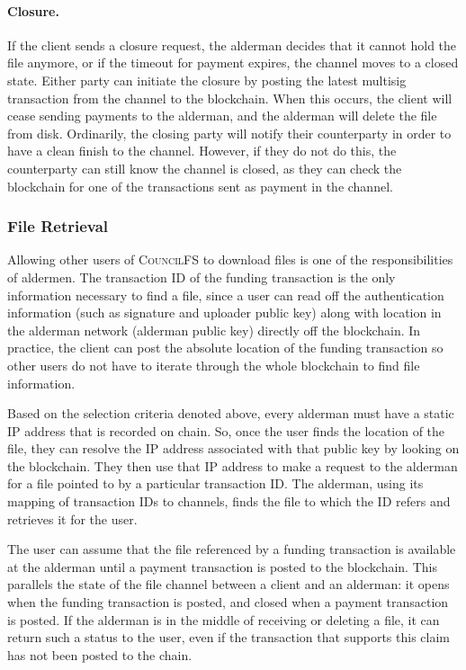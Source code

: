 \documentclass{article}
\begin{document}
\paragraph{Closure.} If the client sends a closure request, the alderman decides
that it cannot hold the file anymore, or if the timeout for payment expires, the
channel moves to a closed state. Either party can initiate the closure by
posting the latest multisig transaction from the channel to the blockchain. When
this occurs, the client will cease sending payments to the alderman, and the
alderman will delete the file from disk. Ordinarily, the closing party will
notify their counterparty in order to have a clean finish to the channel.
However, if they do not do this, the counterparty can still know the channel is
closed, as they can check the blockchain for one of the transactions sent as
payment in the channel.

\subsubsection{File Retrieval}

Allowing other users of \textsc{CouncilFS} to download files is one of the
responsibilities of aldermen. The transaction ID of the funding transaction is
the only information necessary to find a file, since a user can read off the
authentication information (such as signature and uploader public key) along
with location in the alderman network (alderman public key) directly off the
blockchain. In practice, the client can post the absolute location of the
funding transaction so other users do not have to iterate through the whole
blockchain to find file information.

Based on the selection criteria denoted above, every alderman must have a static
IP address that is recorded on chain. So, once the user finds the location of
the file, they can resolve the IP address associated with that public key by
looking on the blockchain. They then use that IP address to make a request to
the alderman for a file pointed to by a particular transaction ID. The alderman,
using its mapping of transaction IDs to channels, finds the file to which the ID
refers and retrieves it for the user.

The user can assume that the file referenced by a funding transaction is
available at the alderman until a payment transaction is posted to the
blockchain. This parallels the state of the file channel between a client and an
alderman: it opens when the funding transaction is posted, and closed when a
payment transaction is posted. If the alderman is in the middle of receiving or
deleting a file, it can return such a status to the user, even if the
transaction that supports this claim has not been posted to the chain. 
\end{document}
